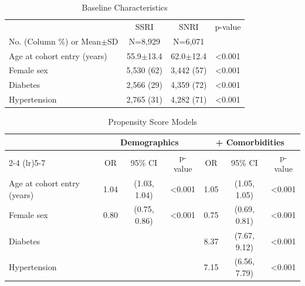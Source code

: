 \documentclass{article}
\begin{document}
\begin{table}[htbp]
\centering
\captionsetup{justification=raggedright,singlelinecheck=false}
\caption{Baseline Characteristics}
\label{tab:demo_latex_report}
\begin{tabular}{lccc}
\toprule
 & SSRI & SNRI & p-value \\
No. (Column \%) or Mean\ensuremath{\pm}SD & N=8,929 & N=6,071 &  \\
\midrule
Age at cohort entry (years) & 55.9\ensuremath{\pm}13.4 & 62.0\ensuremath{\pm}12.4 & \textless{}0.001 \\
Female sex & 5,530 (62) & 3,442 (57) & \textless{}0.001 \\
Diabetes & 2,566 (29) & 4,359 (72) & \textless{}0.001 \\
Hypertension & 2,765 (31) & 4,282 (71) & \textless{}0.001 \\
\bottomrule
\end{tabular}
\end{table}

\begin{table}[htbp]
\centering
\captionsetup{justification=raggedright,singlelinecheck=false}
\caption{Propensity Score Models}
\label{tab:demo_latex_report-2}
\begin{tabular}{lcccccc}
\toprule
 & \multicolumn{3}{c}{Demographics} & \multicolumn{3}{c}{+ Comorbidities} \\
\cmidrule(lr){2-4} \cmidrule(lr){5-7}
 & OR & 95\% CI & p-value & OR & 95\% CI & p-value \\
\midrule
Age at cohort entry (years) & 1.04 & (1.03, 1.04) & \textless{}0.001 & 1.05 & (1.05, 1.05) & \textless{}0.001 \\
Female sex & 0.80 & (0.75, 0.86) & \textless{}0.001 & 0.75 & (0.69, 0.81) & \textless{}0.001 \\
Diabetes &  &  &  & 8.37 & (7.67, 9.12) & \textless{}0.001 \\
Hypertension &  &  &  & 7.15 & (6.56, 7.79) & \textless{}0.001 \\
\bottomrule
\end{tabular}
\end{table}
\end{document}
